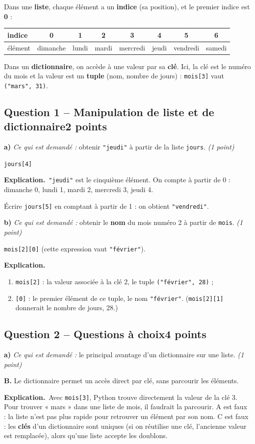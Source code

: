 \documentclass[11pt, a4paper]{exam}
\newcommand{\code}[1]{\texttt{#1}}
\newcommand{\Qt}[2]{\subsection*{#1\hfill{\normalfont\small #2}}}
\newcommand{\rappel}[1]{\noindent\textit{Ce qui est demandé :} #1\par\smallskip}
\newcommand{\explication}{\noindent\textbf{Explication.}\ }
\begin{document}
\begin{retenir}
Dans une \textbf{liste}, chaque élément a un \textbf{indice} (sa position), et le premier indice est \textbf{0} :
\begin{center}\small
\begin{tabular}{|l|*{7}{c|}}\hline
indice & 0 & 1 & 2 & 3 & 4 & 5 & 6 \\\hline
élément & dimanche & lundi & mardi & mercredi & jeudi & vendredi & samedi \\\hline
\end{tabular}
\end{center}
Dans un \textbf{dictionnaire}, on accède à une valeur par sa \textbf{clé}. Ici, la clé est le numéro du mois et la valeur est un \textbf{tuple} (nom, nombre de jours) : \code{mois[3]} vaut \code{("mars", 31)}.
\end{retenir}

\Qt{Question 1 -- Manipulation de liste et de dictionnaire}{2 points}

\textbf{a)} \rappel{obtenir \code{"jeudi"} à partir de la liste \code{jours}. \hfill\textit{(1 point)}}
\begin{reponse}
\code{jours[4]}
\end{reponse}
\explication \code{"jeudi"} est le cinquième élément. On compte à partir de 0 : dimanche 0, lundi 1, mardi 2, mercredi 3, jeudi 4.

\begin{erreur}
Écrire \code{jours[5]} en comptant à partir de 1 : on obtient \code{"vendredi"}.
\end{erreur}

\textbf{b)} \rappel{obtenir le \textbf{nom} du mois numéro 2 à partir de \code{mois}. \hfill\textit{(1 point)}}
\begin{reponse}
\code{mois[2][0]} (cette expression vaut \code{"février"}).
\end{reponse}
\explication
\begin{enumerate}
\item \code{mois[2]} : la valeur associée à la clé 2, le tuple \code{("février", 28)} ;
\item \code{[0]} : le premier élément de ce tuple, le nom \code{"février"}. (\code{mois[2][1]} donnerait le nombre de jours, 28.)
\end{enumerate}

\Qt{Question 2 -- Questions à choix}{4 points}

\textbf{a)} \rappel{le principal avantage d'un dictionnaire sur une liste. \hfill\textit{(1 point)}}
\begin{reponse}
\textbf{B.} Le dictionnaire permet un accès direct par clé, sans parcourir les éléments.
\end{reponse}
\explication Avec \code{mois[3]}, Python trouve directement la valeur de la clé 3. Pour trouver « mars » dans une liste de mois, il faudrait la parcourir. A est faux : la liste n'est pas plus rapide pour retrouver un élément par son nom. C est faux : les \textbf{clés} d'un dictionnaire sont uniques (si on réutilise une clé, l'ancienne valeur est remplacée), alors qu'une liste accepte les doublons.
\end{document}

